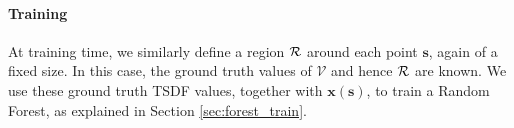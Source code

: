 \documentclass[10pt,twocolumn,letterpaper]{article}
\newcommand{\pixelidx}{\mathbf{s}}
\newcommand{\voxelgrid}{\mathcal{V}}
\newcommand{\note}[1]{\textcolor{blue}{NOTE: #1}}
\begin{document}


\paragraph{Training}
At training time, we similarly define a region $\mathcal{R}$ around each point $\pixelidx$, again of a fixed size. 
In this case, the ground truth values of $\voxelgrid$ and hence $\mathcal{R}$ are known. 
We use these ground truth TSDF values, together with $\mathbf{x}(\pixelidx)$, to train a Random Forest, as explained in  Section \ref{sec:forest_train}.
\end{document}
